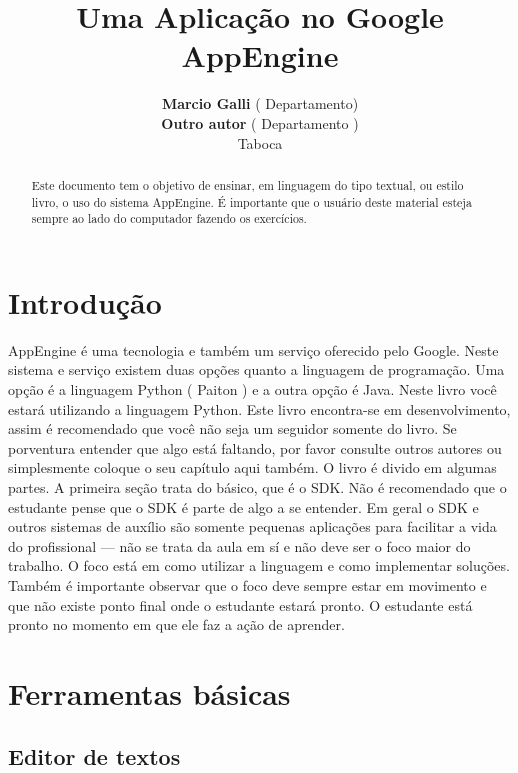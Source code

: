 \documentclass[a4paper]{article}
\title{Uma Aplicação no Google AppEngine}
\author{\textbf{Marcio Galli} ( Departamento)\\
        \textbf{Outro autor} ( Departamento )\\
        Taboca}
\begin{document}
\maketitle
\begin{abstract}
Este documento tem o objetivo de ensinar, em linguagem do tipo textual, ou estilo livro, o uso do sistema AppEngine. É importante que o usuário deste material esteja sempre ao lado do computador fazendo os exercícios. 
\end{abstract}
\tableofcontents



\section{Introdu\c{c}\~{a}o}

AppEngine é uma tecnologia e também um serviço oferecido pelo Google. Neste sistema e serviço existem duas opções quanto a linguagem de programação. Uma opção é a linguagem Python ( Paiton ) e a outra opção é Java. Neste livro você estará utilizando a linguagem Python. Este livro encontra-se em desenvolvimento, assim é recomendado que você não seja um seguidor somente do livro. Se porventura entender que algo está faltando, por favor consulte outros autores ou simplesmente coloque o seu capítulo aqui também. O livro é divido em algumas partes. A primeira seção trata do básico, que é o SDK. Não é recomendado que o estudante pense que o SDK é parte de algo a se entender. Em geral o SDK e outros sistemas de auxílio são somente pequenas aplicações para facilitar a vida do profissional --- não se trata da aula em sí e não deve ser o foco maior do trabalho. O foco está em como utilizar a linguagem e como implementar soluções. Também é importante observar que o foco deve sempre estar em movimento e que não existe ponto final onde o estudante estará  pronto. O estudante está pronto no momento em  que ele faz a ação de aprender.


\section{Ferramentas básicas}

\subsection{Editor de textos}
\end{document}
